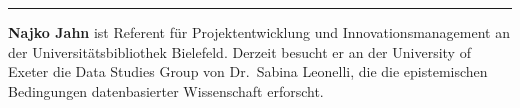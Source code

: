 \begin{center}\rule{0.5\linewidth}{\linethickness}\end{center}

\textbf{Najko Jahn} ist Referent für Projektentwicklung und
Innovationsmanagement an der Universitätsbibliothek Bielefeld. Derzeit
besucht er an der University of Exeter die Data Studies Group von
Dr.~Sabina Leonelli, die die epistemischen Bedingungen datenbasierter
Wissenschaft erforscht.
